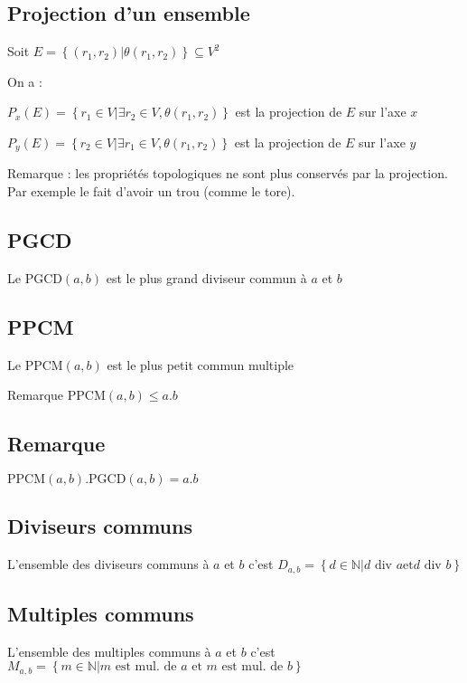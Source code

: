\documentclass[a4paper,10pt]{article}
\newcommand{\N}{\mathbb{N}}
\newcommand{\tset}[1]{\left\lbrace #1 \right\rbrace}
\newcommand{\PGCD}{\mbox{PGCD}}
\newcommand{\PPCM}{\mbox{PPCM}}
\begin{document}
\subsection{Projection d'un ensemble}

Soit $E = \tset{(r_1,r_2) \vert \theta(r_1,r_2)} \subseteq V^2$

On a :

$P_x(E) = \tset{r_1 \in V \vert \exists r_2 \in V, \theta(r_1,r_2)}$ est la projection de $E$ sur l'axe $x$

$P_y(E) = \tset{r_2 \in V \vert \exists r_1 \in V, \theta(r_1,r_2)}$ est la projection de $E$ sur l'axe $y$

Remarque : les propriétés topologiques ne sont plus conservés par la projection. Par exemple le fait d'avoir un trou (comme le tore).

\subsection{PGCD}

Le $\PGCD(a,b)$ est le plus grand diviseur commun à $a$ et $b$

\subsection{PPCM}

Le $\PPCM(a,b)$ est le plus petit commun multiple

Remarque $\PPCM(a,b) \leq a.b$

\subsection{Remarque}

$\PPCM(a,b).\PGCD(a,b) = a.b$

\subsection{Diviseurs communs}

L'ensemble des diviseurs communs à $a$ et $b$ c'est $D_{a,b} = \tset{d \in \N \vert d \mbox{ div } a \mbox{et} d \mbox{ div } b}$

\subsection{Multiples communs}

L'ensemble des multiples communs à $a$ et $b$ c'est $M_{a,b} = \tset{m \in \N \vert m \mbox{ est mul. de } a \mbox{ et } m \mbox{ est mul. de } b}$
\end{document}
